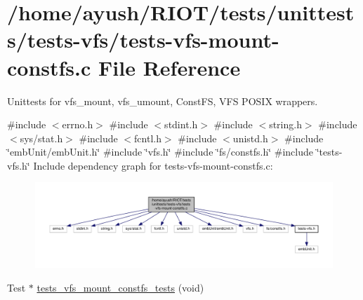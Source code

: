\hypertarget{tests-vfs-mount-constfs_8c}{}\section{/home/ayush/\+R\+I\+O\+T/tests/unittests/tests-\/vfs/tests-\/vfs-\/mount-\/constfs.c File Reference}
\label{tests-vfs-mount-constfs_8c}


Unittests for vfs\+\_\+mount, vfs\+\_\+umount, Const\+FS, V\+FS P\+O\+S\+IX wrappers.  


{\ttfamily \#include $<$errno.\+h$>$}\newline
{\ttfamily \#include $<$stdint.\+h$>$}\newline
{\ttfamily \#include $<$string.\+h$>$}\newline
{\ttfamily \#include $<$sys/stat.\+h$>$}\newline
{\ttfamily \#include $<$fcntl.\+h$>$}\newline
{\ttfamily \#include $<$unistd.\+h$>$}\newline
{\ttfamily \#include \char`\"{}emb\+Unit/emb\+Unit.\+h\char`\"{}}\newline
{\ttfamily \#include \char`\"{}vfs.\+h\char`\"{}}\newline
{\ttfamily \#include \char`\"{}fs/constfs.\+h\char`\"{}}\newline
{\ttfamily \#include \char`\"{}tests-\/vfs.\+h\char`\"{}}\newline
Include dependency graph for tests-\/vfs-\/mount-\/constfs.c\+:
\nopagebreak
\begin{figure}[H]
\begin{center}
\leavevmode
\includegraphics[width=350pt]{tests-vfs-mount-constfs_8c__incl}
\end{center}
\end{figure}
\begin{DoxyCompactItemize}
\item 
Test $\ast$ \hyperlink{tests-vfs-mount-constfs_8c_a15914761731ece3546c1f4ae3b262c58}{tests\+\_\+vfs\+\_\+mount\+\_\+constfs\+\_\+tests} (void)
\end{DoxyCompactItemize}


